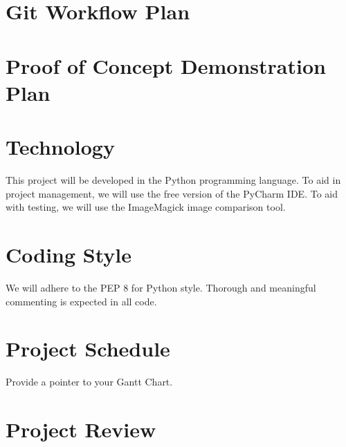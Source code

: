 \documentclass{article}
\begin{document}
\section{Git Workflow Plan}

\section{Proof of Concept Demonstration Plan} %

\section{Technology} %
This project will be developed in the Python programming language. To aid in project management, we will use the free version of the PyCharm IDE. To aid with testing, we will use the ImageMagick image comparison tool.

\section{Coding Style} %
We will adhere to the PEP 8 for Python style. Thorough and meaningful commenting is expected in all code.

\section{Project Schedule}

Provide a pointer to your Gantt Chart.

\section{Project Review} 
\end{document}
